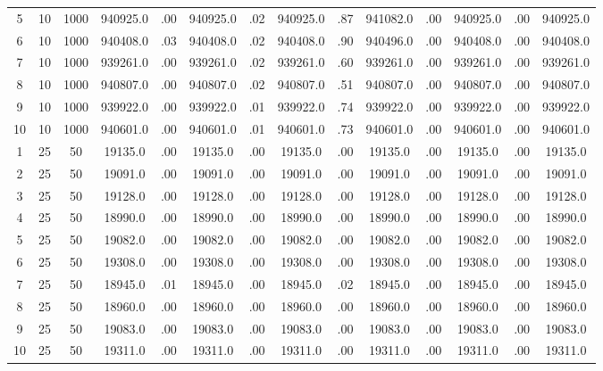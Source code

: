 \documentclass[12pt,a4paper]{article}
\begin{document}
\begin{center}
{\begin{tabular}{|ccc|cc|cc|cc|cc|cc|c|}
5             &  10&1000& 940925.0&  .00& 940925.0&  .02& 940925.0&  .87& 941082.0&  .00& 940925.0&  .00& 940925.0\\[-0.01in]
6             &  10&1000& 940408.0&  .03& 940408.0&  .02& 940408.0&  .90& 940496.0&  .00& 940408.0&  .00& 940408.0\\[-0.01in]
7             &  10&1000& 939261.0&  .00& 939261.0&  .02& 939261.0&  .60& 939261.0&  .00& 939261.0&  .00& 939261.0\\[-0.01in]
8             &  10&1000& 940807.0&  .00& 940807.0&  .02& 940807.0&  .51& 940807.0&  .00& 940807.0&  .00& 940807.0\\[-0.01in]
9             &  10&1000& 939922.0&  .00& 939922.0&  .01& 939922.0&  .74& 939922.0&  .00& 939922.0&  .00& 939922.0\\[-0.01in]
10            &  10&1000& 940601.0&  .00& 940601.0&  .01& 940601.0&  .73& 940601.0&  .00& 940601.0&  .00& 940601.0\\[-0.01in]
1             &  25&  50&  19135.0&  .00&  19135.0&  .00&  19135.0&  .00&  19135.0&  .00&  19135.0&  .00&  19135.0\\[-0.01in]
2             &  25&  50&  19091.0&  .00&  19091.0&  .00&  19091.0&  .00&  19091.0&  .00&  19091.0&  .00&  19091.0\\[-0.01in]
3             &  25&  50&  19128.0&  .00&  19128.0&  .00&  19128.0&  .00&  19128.0&  .00&  19128.0&  .00&  19128.0\\[-0.01in]
4             &  25&  50&  18990.0&  .00&  18990.0&  .00&  18990.0&  .00&  18990.0&  .00&  18990.0&  .00&  18990.0\\[-0.01in]
5             &  25&  50&  19082.0&  .00&  19082.0&  .00&  19082.0&  .00&  19082.0&  .00&  19082.0&  .00&  19082.0\\[-0.01in]
6             &  25&  50&  19308.0&  .00&  19308.0&  .00&  19308.0&  .00&  19308.0&  .00&  19308.0&  .00&  19308.0\\[-0.01in]
7             &  25&  50&  18945.0&  .01&  18945.0&  .00&  18945.0&  .02&  18945.0&  .00&  18945.0&  .00&  18945.0\\[-0.01in]
8             &  25&  50&  18960.0&  .00&  18960.0&  .00&  18960.0&  .00&  18960.0&  .00&  18960.0&  .00&  18960.0\\[-0.01in]
9             &  25&  50&  19083.0&  .00&  19083.0&  .00&  19083.0&  .00&  19083.0&  .00&  19083.0&  .00&  19083.0\\[-0.01in]
10            &  25&  50&  19311.0&  .00&  19311.0&  .00&  19311.0&  .00&  19311.0&  .00&  19311.0&  .00&  19311.0\\[-0.01in]

\end{tabular}}
\end{center}
\end{document}
